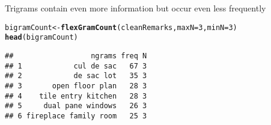 \documentclass{article}\usepackage[]{graphicx}\usepackage[]{color}
\makeatletter
\newcommand{\hlnum}[1]{\textcolor[rgb]{0.686,0.059,0.569}{#1}}%
\newcommand{\hlstd}[1]{\textcolor[rgb]{0.345,0.345,0.345}{#1}}%
\newcommand{\hlkwb}[1]{\textcolor[rgb]{0.69,0.353,0.396}{#1}}%
\newcommand{\hlkwc}[1]{\textcolor[rgb]{0.333,0.667,0.333}{#1}}%
\newcommand{\hlkwd}[1]{\textcolor[rgb]{0.737,0.353,0.396}{\textbf{#1}}}%
\newenvironment{kframe}{%
 \def\at@end@of@kframe{}%
 \ifinner\ifhmode%
  \def\at@end@of@kframe{\end{minipage}}%
  \begin{minipage}{\columnwidth}%
 \fi\fi%
 \def\FrameCommand##1{\hskip\@totalleftmargin \hskip-\fboxsep
 \colorbox{shadecolor}{##1}\hskip-\fboxsep
     \hskip-\linewidth \hskip-\@totalleftmargin \hskip\columnwidth}%
 \MakeFramed {\advance\hsize-\width
   \@totalleftmargin\z@ \linewidth\hsize
   \@setminipage}}%
 {\par\unskip\endMakeFramed%
 \at@end@of@kframe}
\newenvironment{knitrout}{}{} %
\makeatother
\begin{document}
\noindent Trigrams contain even more information but occur even less frequently
\begin{knitrout}\footnotesize
{}\color{fgcolor}\begin{kframe}
\begin{alltt}
\hlstd{bigramCount} \hlkwb{<-} \hlkwd{flexGramCount}\hlstd{(cleanRemarks ,} \hlkwc{maxN}\hlstd{=}\hlnum{3} \hlstd{,} \hlkwc{minN}\hlstd{=}\hlnum{3}\hlstd{)}
\hlkwd{head}\hlstd{(bigramCount)}
\end{alltt}
\begin{verbatim}
##                  ngrams freq N
## 1            cul de sac   67 3
## 2            de sac lot   35 3
## 3       open floor plan   28 3
## 4    tile entry kitchen   28 3
## 5     dual pane windows   26 3
## 6 fireplace family room   25 3
\end{verbatim}
\end{kframe}
\end{knitrout}
\end{document}
